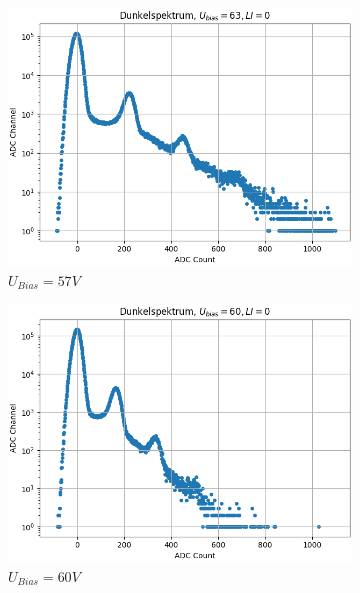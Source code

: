 \documentclass[12pt]{article}
\begin{document}
\begin{figure}[h!]
  \centering
  \begin{subfigure}{0.32\textwidth}
    \includegraphics[width=\textwidth]{Grafiken/dunkel_57}
    \caption{$U_{Bias} = 57V$}
  \end{subfigure}
  \hfill
  \begin{subfigure}{0.32\textwidth}
    \includegraphics[width=\textwidth]{Grafiken/dunkel_60}
    \caption{$U_{Bias} = 60V$}
  \end{subfigure}
  \hfill
  \begin{subfigure}{0.32\textwidth}

\end{subfigure}
\end{figure}
\end{document}
